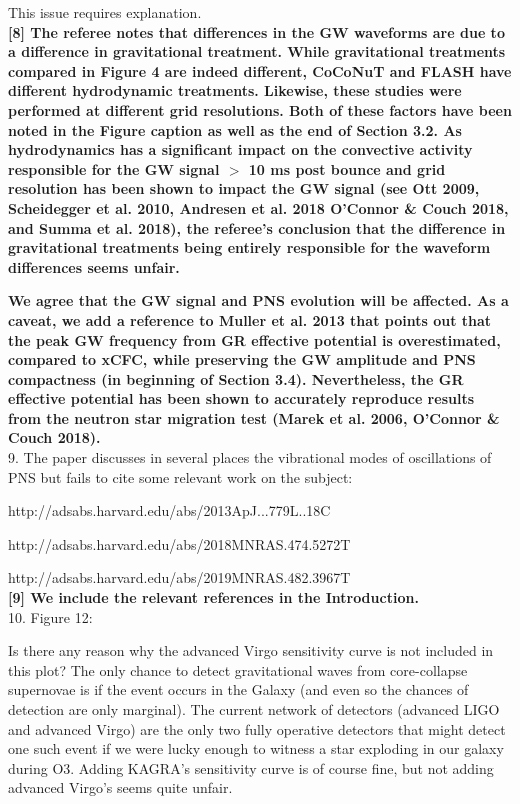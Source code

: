 \documentclass[11pt]{article}
\begin{document}
This issue requires explanation.\\

\textbf{[8] The referee notes that differences in the GW waveforms are due to a difference in gravitational treatment.  While gravitational treatments compared in Figure 4 are indeed different, CoCoNuT and FLASH have different hydrodynamic treatments.  Likewise, these studies were performed at different grid resolutions.  Both of these factors have been noted in the Figure caption as well as the end of Section 3.2.  As hydrodynamics has a significant impact on the convective activity responsible for the GW signal $>$ 10 ms post bounce and grid resolution has been shown to impact the GW signal (see Ott 2009, Scheidegger et al. 2010, Andresen et al. 2018 O'Connor \& Couch 2018, and Summa et al. 2018), the referee's conclusion that the difference in gravitational treatments being entirely responsible for the waveform differences seems unfair.}

\textbf{We agree that the GW signal and PNS evolution will be affected.  As a caveat, we add a reference to Muller et al. 2013 that points out that the peak GW frequency from GR effective potential is overestimated, compared to xCFC, while preserving the GW amplitude and PNS compactness (in beginning of Section 3.4).  Nevertheless, the GR effective potential has been shown to accurately reproduce results from the neutron star migration test (Marek et al. 2006, O'Connor \& Couch 2018).}\\

9. The paper discusses in several places the vibrational modes of oscillations of
PNS but fails to cite some relevant work on the subject:

http://adsabs.harvard.edu/abs/2013ApJ...779L..18C

http://adsabs.harvard.edu/abs/2018MNRAS.474.5272T

http://adsabs.harvard.edu/abs/2019MNRAS.482.3967T\\

\textbf{[9] We include the relevant references in the Introduction.}\\

10. Figure 12:

Is there any reason why the advanced Virgo sensitivity curve is not included in this plot? The only chance to detect gravitational waves from core-collapse supernovae is  if the event occurs in the Galaxy (and even so the chances of detection are only marginal). The current network of detectors (advanced LIGO and advanced Virgo) are the only two fully operative detectors that might detect one such event if we were lucky enough to witness a star exploding in our galaxy during O3. Adding KAGRA's sensitivity curve is of course fine, but not adding advanced Virgo's seems quite unfair.
\end{document}
